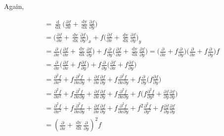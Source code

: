 \documentclass[12 pt]{article}
\begin{document}
Again, 

\begin{equation*}
	\begin{split}
		\frac{\mathop{\mathrm{d^{2}f}}}{\mathop{\mathrm{dx^{2}}}} &= \frac{\mathop{\mathrm{d}}}{\mathop{\mathrm{dx}}}\bigg(\frac{\partial f}{\partial x} + \frac{\mathop{\mathrm{dy}}}{\mathop{\mathrm{dx}}}\frac{\partial f}{\partial y}\bigg)\\ 
		&=  \bigg(\frac{\partial f}{\partial x}+\frac{\mathop{\mathrm{dy}}}{\mathop{\mathrm{dx}}}\frac{\partial f}{\partial y}\bigg)_{x} +   f\bigg(\frac{\partial f}{\partial x}+\frac{\mathop{\mathrm{dy}}}{\mathop{\mathrm{dx}}}\frac{\partial f}{\partial y}\bigg)_{y}\\
		&= \frac{\partial }{\partial x}\bigg(\frac{\partial f}{\partial x}+\frac{\mathop{\mathrm{dy}}}{\mathop{\mathrm{dx}}}\frac{\partial f}{\partial y}\bigg)+f\frac{\partial }{\partial y}\bigg(\frac{\partial f}{\partial x}+\frac{\mathop{\mathrm{dy}}}{\mathop{\mathrm{dx}}}\frac{\partial f}{\partial y}\bigg)=\bigg(\frac{\partial }{\partial x}+f\frac{\partial }{\partial y}\bigg)\bigg(\frac{\partial }{\partial x}+f\frac{\partial }{\partial y}\bigg)f\\
		&= \frac{\partial }{\partial x}\bigg(\frac{\partial f}{\partial x}+f\frac{\partial f}{\partial y}\bigg)+f\frac{\partial }{\partial y}\bigg(\frac{\partial f}{\partial x}+f\frac{\partial f}{\partial y}\bigg)\\
		&= \frac{\partial^{2}f}{\partial x^{2}} + f\frac{\partial^{2}f}{\partial x \partial y}+\frac{\partial f}{\partial x}\frac{\partial f}{\partial y} + f\frac{\partial^{2}f}{\partial x \partial y} + f\frac{\partial }{\partial y}\bigg(f\frac{\partial f}{\partial y}\bigg)\\
		&= \frac{\partial^{2}f}{\partial x^{2}} + f\frac{\partial^{2}f}{\partial x \partial y}+\frac{\partial f}{\partial x}\frac{\partial f}{\partial y} + f\frac{\partial^{2}f}{\partial x \partial y} + f\bigg(f\frac{\partial^{2}f}{\partial y^{2}}+\frac{\partial f}{\partial y}\frac{\partial f}{\partial y}\bigg)\\
		&= \frac{\partial^{2}f}{\partial x^{2}} + f\frac{\partial^{2}f}{\partial x \partial y}+\frac{\partial f}{\partial x}\frac{\partial f}{\partial y} + f\frac{\partial^{2}f}{\partial x \partial y} + f^{2}\frac{\partial^{2}f}{\partial y^{2}}+f\frac{\partial f}{\partial y}\frac{\partial f}{\partial y}\\
		&=  (\frac{\partial }{\partial x} + \frac{\mathop{\mathrm{dy}}}{\mathop{\mathrm{dx}}}\frac{\partial }{\partial y})^{2}f\\
	\end{split}
\end{equation*}
\end{document}

